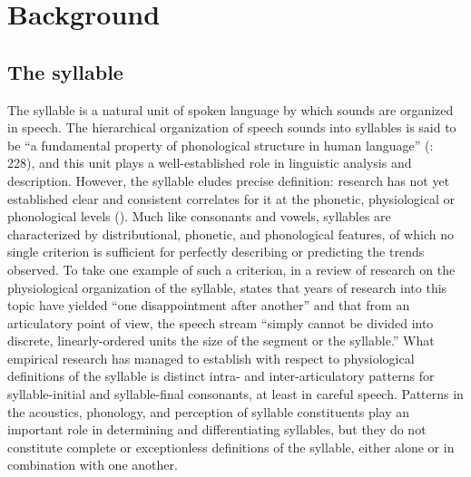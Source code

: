 \section{Background}\label{sec:1.1}
\subsection{The syllable}\label{sec:1.1.1}

  The syllable is a natural unit of spoken language by which sounds are organized in speech. The hierarchical organization of speech sounds into syllables is said to be “a fundamental property of phonological structure in human language” (\citealt{GoldsteinEtAl2006}: 228), and this unit plays a well-established role in linguistic analysis and description. However, the syllable eludes precise definition: research has not yet established clear and consistent correlates for it at the phonetic, physiological or phonological levels (\citealt{BellHooper1978,Laver1994,Krakow1999}). Much like consonants and vowels, syllables are characterized by distributional, phonetic, and phonological features, of which no single criterion is sufficient for perfectly describing or predicting the trends observed. To take one example of such a criterion, in a review of research on the physiological organization of the syllable, \citet[23--34]{Krakow1999} states that years of research into this topic have yielded “one disappointment after another” and that from an articulatory point of view, the speech stream “simply cannot be divided into discrete, linearly-ordered units the size of the segment or the syllable.” What empirical research has managed to establish with respect to physiological definitions of the syllable is distinct intra- and inter-articulatory patterns for syllable-initial and syllable-final consonants, at least in careful speech. Patterns in the acoustics, phonology, and perception of syllable constituents play an important role in determining and differentiating syllables, but they do not constitute complete or exceptionless definitions of the syllable, either alone or in combination with one another.


